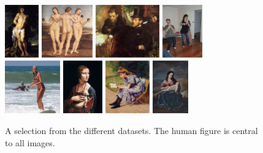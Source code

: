 \documentclass[conference]{IEEEtran}
\begin{document}
\begin{figure}[h]
	\centering
	{
		\includegraphics[height=0.9in]{15_96_peter-paul-rubens_st-sebastian}
		\includegraphics[height=0.9in]{26_4_raphael_the-three-graces-1505}
		\includegraphics[height=0.9in]{37_79_edgar-degas_jeantaud-linet-and-laine-1871}
		\includegraphics[height=0.9in]{22_21_000000084015 - kopie}\\
		\vspace{0.05in}
	}
	{
		\includegraphics[height=0.9in]{28_1_000000032850}
		\includegraphics[height=0.9in]{16_10_leonardo-da-vinci_the-lady-with-the-ermine-cecilia-gallerani-1496}
		\includegraphics[height=0.9in]{36_65_federico-zandomeneghi_the-reader}
		\includegraphics[height=0.9in]{24_10_alonzo-cano_the-virgin-and-child-1643}
	}
	\caption{A selection from the different datasets. The human figure is central to all images.}
	\label{fig:style_transfer_dataset}
\end{figure}
\end{document}
